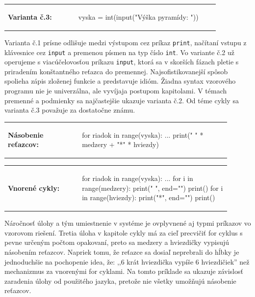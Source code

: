 \vspace{-2em}
\begin{tabular}{@{}p{0.3\linewidth}p{0.6\linewidth}}
\textbf{\small Varianta č.3:} &
\vspace{-1em}
\begin{solution}
vyska = int(input("Výška pyramídy: "))
\end{solution}
\end{tabular}

Varianta č.1 prísne odlišuje medzi výstupom cez príkaz \verb|print|, načítaní vstupu z klávesnice cez \verb|input| a premenou písmen na typ číslo \verb|int|. Vo variante č.2 už operujeme s viacúčelovosťou príkazu \verb|input|, ktorá sa v skorších fázach pletie s priradením konštantného reťazca do premennej. Najsofistikovanejší spôsob spolieha zápis zloženej funkcie a predstavuje idióm. Žiadna syntax vzorového programu nie je univerzálna, ale vyvíjaja postupom kapitolami. V témach premenné a podmienky sa najčastejšie ukazuje varianta č.2. Od téme cykly sa varianta č.3 považuje za dostatočne známu.

\begin{tabular}{@{}p{0.3\linewidth}p{0.6\linewidth}}
\textbf{\small Násobenie reťazcov:} &
\vspace{-1em}
\begin{solution}
for riadok in range(vyska):
	...
	print(" " * medzery + "*" * hviezdy)
\end{solution}
\end{tabular}

\vspace{-2em}
\begin{tabular}{@{}p{0.3\linewidth}p{0.6\linewidth}}
\textbf{\small Vnorené cykly:} &
\vspace{-1em}
\begin{solution}
for riadok in range(vyska):
	...
	for i in range(medzery):
		print(" ", end="")
	print()
	for i in range(hviezdy):
		print("*", end="")
	print()
\end{solution}
\end{tabular}

Náročnosť úlohy a tým umiestnenie v systéme je ovplyvnené aj typmi príkazov vo vzorovom riešení. Tretia úloha v kapitole cykly má za cieľ precvičiť for cyklus s pevne určeným počtom opakovaní, preto sa medzery a hviezdičky vypisujú násobením reťazcov. Napriek tomu, že reťazce sa dosiaľ neprebrali do hĺbky je jednoduchšie na pochopenie idea, že: ,,6 krát hviezdička vypíše 6 hviezdičiek'' než mechanizmus za vnorenými for cyklami. Na tomto príklade sa ukazuje závislosť zaradenia úlohy od použitého jazyka, pretože nie všetky umožňujú násobenie reťazcov.

